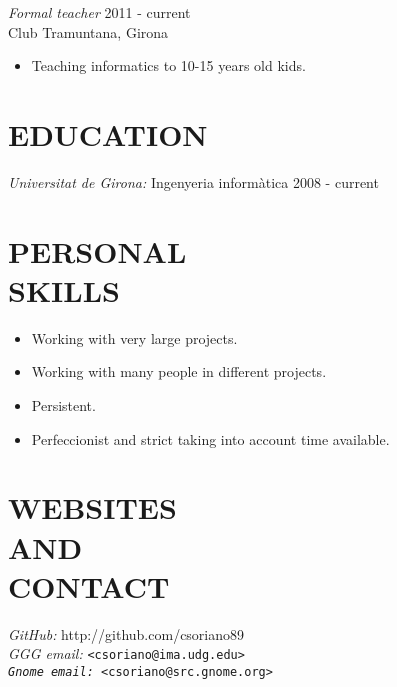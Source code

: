 \documentclass[margin]{}
\begin{document}
\begin{resume}
                {\sl Formal teacher} \hfill 2011 - current \\
                Club Tramuntana, Girona
                \begin{itemize}  \itemsep -2pt
                \item Teaching informatics to 10-15 years old kids. 
                \end{itemize}
                
\section{\small EDUCATION}
                {\sl Universitat de Girona:} Ingenyeria informàtica \hfill 2008 - current \\

\section{\small PERSONAL \\ SKILLS}
                \begin{itemize}  \itemsep -2pt
                \item Working with very large projects.
                \item Working with many people in different projects.
                \item Persistent.
                \item Perfeccionist and strict taking into account time available.
                \end{itemize}
                
\section{\small WEBSITES \\ AND \\ CONTACT}
                {\sl GitHub:} http://github.com/csoriano89 \\
                {\sl GGG email:} \tt <csoriano@ima.udg.edu> \\
                {\sl Gnome email:} \tt <csoriano@src.gnome.org> \\

\end{resume}
\end{document}
